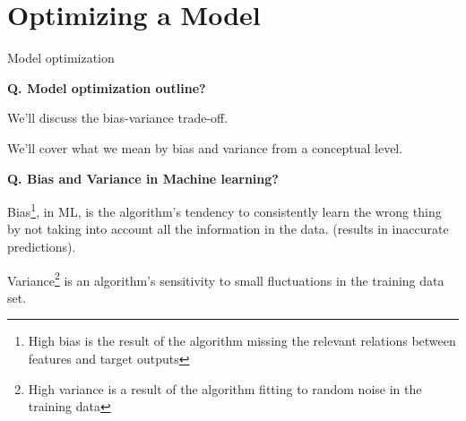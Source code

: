 \section{Optimizing a Model}
\begin{transitionframe}
  \begin{center}
    \Huge Model optimization
  \end{center}
\end{transitionframe}

\begin{frame}[fragile]{\textbf{Q. Model optimization outline?}}
  \begin{wideitemize}
    \item We'll discuss the bias-variance trade-off.
    \item We'll cover what we mean by bias and variance from a conceptual level.
  \end{wideitemize}
\end{frame}

\begin{frame}[fragile]{\textbf{Q. Bias and Variance in Machine learning?}}
  \begin{wideitemize}
    \item Bias\footnote{High bias is the result of the algorithm missing the
    relevant relations between features and target outputs}, in ML, is the algorithm's
    tendency to consistently learn the wrong thing by not taking into account
    all the information in the data. (results in inaccurate predictions).
    \item Variance\footnote{High variance is a result of the algorithm fitting to
    random noise in the training data} is an algorithm's sensitivity
    to small fluctuations in the training data set.
  \end{wideitemize}
\end{frame}


